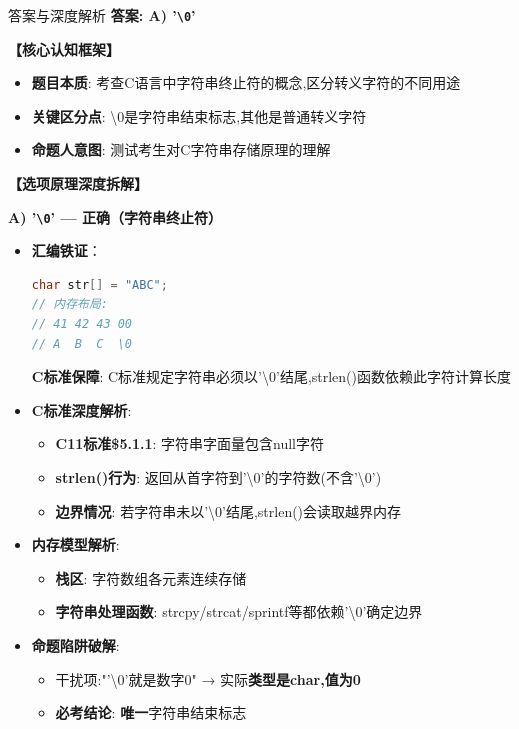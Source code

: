 \documentclass[a4paper,12pt]{article}
\begin{document}
\begin{bluebox}{答案与深度解析}
	\textbf{答案: A) '\texttt{\textbackslash0}'}

	\textbf{【核心认知框架】}
	\begin{itemize}[leftmargin=*, nosep]
		\item \textbf{题目本质}: 考查C语言中字符串终止符的概念,区分转义字符的不同用途
		\item \textbf{关键区分点}: \textbackslash0是字符串结束标志,其他是普通转义字符
		\item \textbf{命题人意图}: 测试考生对C字符串存储原理的理解
	\end{itemize}

	\textbf{【选项原理深度拆解】}

	\textbf{A) '\texttt{\textbackslash0}' — 正确（字符串终止符）}
	\begin{itemize}[leftmargin=*, nosep]
		\item \textbf{汇编铁证}：
		      \begin{lstlisting}[language=C]
char str[] = "ABC";
// 内存布局:
// 41 42 43 00
// A  B  C  \0
    \end{lstlisting}
		      \textbf{C标准保障}: C标准规定字符串必须以'\textbackslash0'结尾,strlen()函数依赖此字符计算长度

		\item \textbf{C标准深度解析}:
		      \begin{itemize}
			      \item \textbf{C11标准\$5.1.1}: 字符串字面量包含null字符
			      \item \textbf{strlen()行为}: 返回从首字符到'\textbackslash0'的字符数(不含'\textbackslash0')
			      \item \textbf{边界情况}: 若字符串未以'\textbackslash0'结尾,strlen()会读取越界内存
		      \end{itemize}

		\item \textbf{内存模型解析}:
		      \begin{itemize}
			      \item \textbf{栈区}: 字符数组各元素连续存储
			      \item \textbf{字符串处理函数}: strcpy/strcat/sprintf等都依赖'\textbackslash0'确定边界
		      \end{itemize}

		\item \textbf{命题陷阱破解}:
		      \begin{itemize}
			      \item 干扰项:"'\textbackslash0'就是数字0" → 实际\textbf{类型是char,值为0}
			      \item \textbf{必考结论}: \textbf{唯一}字符串结束标志
		      \end{itemize}
	\end{itemize}


\end{bluebox}
\end{document}
